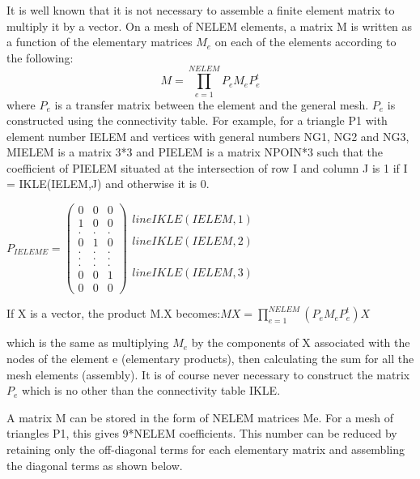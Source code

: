 It is well known that it is not necessary to assemble a finite element matrix
to multiply it by a vector. On a mesh of NELEM elements, a matrix M is written
as a function of the elementary matrices $M_{e}$ on each of the elements according
to the following:
\[M=\prod _{e=1}^{NELEM}P_{e} M_{e} P_{e}^{t}  \]
where $P_{e}$ is a transfer matrix between the element and the general mesh.
$P_{e}$ is constructed using the connectivity table. For example, for a
triangle P1 with element number IELEM and vertices with general numbers NG1,
NG2 and NG3, MIELEM is a matrix 3*3 and PIELEM is a matrix NPOIN*3 such that
the coefficient of PIELEM situated at the intersection of row I and column J is
1 if I = IKLE(IELEM,J) and otherwise it is 0.

$P_{IELEME}=\left(
  \begin{array}{ccc}
    0 & 0 & 0 \\
    1 & 0 & 0 \\
    . & . & . \\
    0 & 1 & 0 \\
    . & . & . \\
    . & . & . \\
    . & . & . \\
    0 & 0 & 1 \\
    0 & 0 & 0
  \end{array}
\right)
  \begin{array}{c}
    \\
    line IKLE(IELEM,1) \\
    \\
    line IKLE(IELEM,2) \\
    \\
    \\
    \\
    line IKLE(IELEM,3) \\
    \\
  \end{array}
$


If X is a vector, the product M.X becomes:$MX=\prod _{e=1}^{NELEM}(P_{e} M_{e}
P_{e}^{t} )X $

which is the same as multiplying $M_{e}$ by the components of X associated with the
nodes of the element e (elementary products), then calculating the sum for all
the mesh elements (assembly). It is of course never necessary to construct the
matrix $P_{e}$ which is no other than the connectivity table IKLE.

A matrix M can be stored in the form of NELEM matrices Me. For a mesh of
triangles P1, this gives 9*NELEM coefficients. This number can be reduced by
retaining only the off-diagonal terms for each elementary matrix and assembling
the diagonal terms as shown below.

